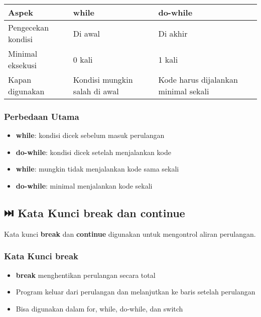 \begin{center}
\begin{tabular}{|l|l|l|}
\hline
\textbf{Aspek} & \textbf{while} & \textbf{do-while} \\
\hline
Pengecekan kondisi & Di awal & Di akhir \\
\hline
Minimal eksekusi & 0 kali & 1 kali \\
\hline
Kapan digunakan & Kondisi mungkin salah di awal & Kode harus dijalankan minimal sekali \\
\hline
\end{tabular}
\end{center}

\subsubsection{Perbedaan Utama}

\begin{itemize}
\item \textbf{while}: kondisi dicek sebelum masuk perulangan
\item \textbf{do-while}: kondisi dicek setelah menjalankan kode
\item \textbf{while}: mungkin tidak menjalankan kode sama sekali
\item \textbf{do-while}: minimal menjalankan kode sekali
\end{itemize}

\subsection{⏭️ Kata Kunci break dan continue}\label{kata-kunci-continue-dan-break}

Kata kunci \textbf{break} dan \textbf{continue} digunakan untuk mengontrol aliran perulangan.

\subsubsection{Kata Kunci break}

\begin{itemize}
\item \textbf{break} menghentikan perulangan secara total
\item Program keluar dari perulangan dan melanjutkan ke baris setelah perulangan
\item Bisa digunakan dalam for, while, do-while, dan switch
\end{itemize}

